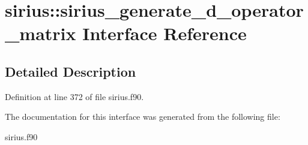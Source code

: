 \hypertarget{interfacesirius_1_1sirius__generate__d__operator__matrix}{}\section{sirius\+:\+:sirius\+\_\+generate\+\_\+d\+\_\+operator\+\_\+matrix Interface Reference}
\label{interfacesirius_1_1sirius__generate__d__operator__matrix}


\subsection{Detailed Description}


Definition at line 372 of file sirius.\+f90.



The documentation for this interface was generated from the following file\+:\begin{DoxyCompactItemize}
\item 
sirius.\+f90\end{DoxyCompactItemize}
